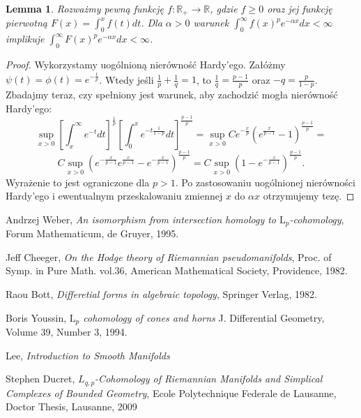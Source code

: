\documentclass[licencjacka]{pracamgr}
\theoremstyle{definition}
\theoremstyle{definition}
\theoremstyle{plain}
\newtheorem{lemma}{Lemma}[section]
\theoremstyle{plain}
\begin{document}
\begin{lemma}
Rozważmy pewną funkcję $f: \mathbb{R}_{+} \rightarrow \mathbb{R}$, gdzie $f
\geq 0$ oraz jej funkcję pierwotną $F(x) = \int_0^{x} f(t) dt$. Dla $\alpha > 0$ warunek
$\int_0^\infty f(x)^p e^{-\alpha x}dx < \infty$ implikuje $\int_0^\infty
F(x)^pe^{- \alpha x}dx < \infty$.  \\
\end{lemma}
\begin{proof}
Wykorzystamy uogólnioną nierówność Hardy'ego.  Załóżmy $\psi(t) = \phi(t) =
e^{- \frac{t}{p} }$. Wtedy jeśli $\frac{1}{p} + \frac{1}{q} = 1 $, to
$\frac{1}{q} = \frac{p-1}{p}$ oraz $-q = \frac{p}{1-p}$.  Zbadajmy teraz, czy
spełniony jest warunek, aby zachodzić mogła nierówność Hardy'ego:
$$
\sup_{x > 0}
\left[
\int_x^\infty  
    e^{-t} dt
\right]^{\frac{1}{p}}
\left[
\int_0^x
    e^{-t \frac{1}{1-p}} dt
\right]^{\frac{p-1}{p}}
=
\sup_{x > 0}
    C
    e^{- \frac{x}{p}}
    \left(
        e^{\frac{x}{p-1}} - 1
    \right)^{\frac{p-1}{p}}
=
$$
$$
C
\sup_{x > 0}
    \left(
    e^{- \frac{x}{p-1}}
        e^{\frac{x}{p-1}} -
    e^{- \frac{x}{p-1}}
    \right)^{\frac{p-1}{p}}
=
C
\sup_{x > 0}
    \left(
        1 -
    e^{- \frac{x}{p-1}}
    \right)^{\frac{p-1}{p}}. 
$$
Wyrażenie to jest ograniczone dla $p> 1$. Po zastosowaniu uogólnionej
nierówności Hardy'ego i ewentualnym przeskalowaniu zmiennej $x$ do $\alpha x$
otrzymujemy tezę.
\end{proof}





\begin{thebibliography}{99}

 Andrzej Weber, \textit{An isomorphism from
  intersection homology to $\mathrm{L}_p$-cohomology}, Forum
  Mathematicum, de Gruyer, 1995.
  
 Jeff Cheeger, \textit{On the Hodge theory
  of Riemannian pseudomanifolds}, Proc. of Symp. in Pure Math. vol.36,
  American Mathematical Society, Providence, 1982.

 Raou Bott, \textit{Differetial forms in algebraic
  topology}, Springer Verlag, 1982.

 Boris Youssin, \textit{$\mathrm{L}_p$
  cohomology of cones and horns } J. Differential Geometry, Volume 39,
  Number 3, 1994.
  
 Lee, \textit{Introduction to Smooth Manifolds}

 Stephen Ducret, \textit{$L_{q,p}$-Cohomology of Riemannian
    Manifolds and Simplical Complexes of Bounded Geometry}, Ecole Polytechnique Federale
    de Lausanne, Doctor Thesis, Lausanne, 2009

\end{thebibliography}
\end{document}
